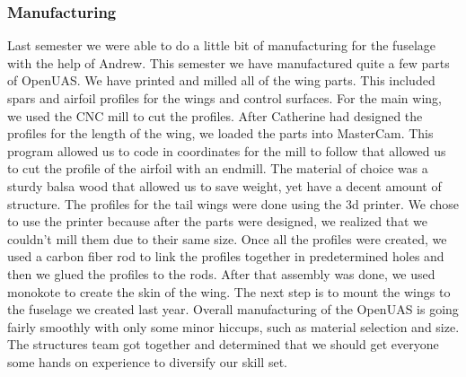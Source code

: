 \documentclass{article}
\begin{document}
\subsubsection{Manufacturing}
\noindent Last semester we were able to do a little bit of manufacturing for the fuselage with the help of Andrew. This semester we have manufactured quite a few parts of OpenUAS. We have printed and milled all of the wing parts. This included spars and airfoil profiles for the wings and control surfaces. For the main wing, we used the CNC mill to cut the profiles. After Catherine had designed the profiles for the length of the wing, we loaded the parts into MasterCam. This program allowed us to code in coordinates for the mill to follow that allowed us to cut the profile of the airfoil with an endmill. The material of choice was a sturdy balsa wood that allowed us to save weight, yet have a decent amount of structure. The profiles for the tail wings were done using the 3d printer. We chose to use the printer because after the parts were designed, we realized that we couldn't mill them due to their same size. Once all the profiles were created, we used a carbon fiber rod to link the profiles together in predetermined holes and then we glued the profiles to the rods. After that assembly was done, we used monokote to create the skin of the wing. The next step is to mount the wings to the fuselage we created last year. Overall manufacturing of the OpenUAS is going fairly smoothly with only some minor hiccups, such as material selection and size. The structures team got together and determined that we should get everyone some hands on experience to diversify our skill set. 
\end{document}
